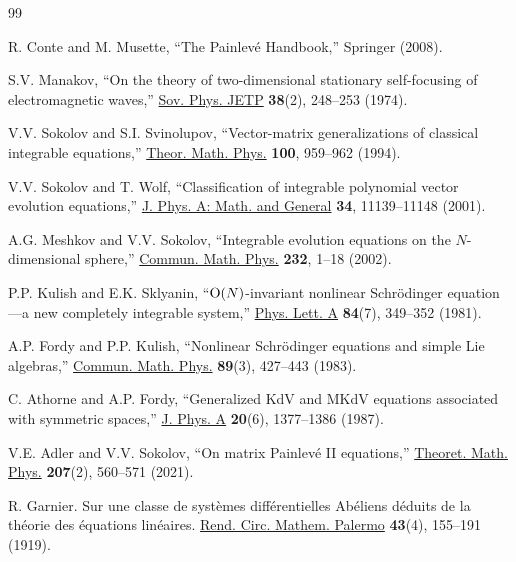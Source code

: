 \documentclass[11pt]{article}
\theoremstyle{plain}
\theoremstyle{definition}
\begin{document}
\begin{thebibliography}{99}

 R. Conte and M. Musette, ``The Painlev\'e Handbook,'' Springer (2008).

 S.V. Manakov, ``On the theory of two-dimensional stationary self-focusing of electromagnetic waves,'' \href{http://jetp.ras.ru/cgi-bin/dn/e_038_02_0248.pdf}{Sov. Phys. JETP} {\bf 38}(2), 248--253 (1974).

 V.V. Sokolov and S.I. Svinolupov, ``Vector-matrix generalizations of classical integrable equations,'' \href{https://doi.org/10.1007/BF01016758}{Theor. Math. Phys.} {\bf 100}, 959--962 (1994).

 V.V. Sokolov and T. Wolf, ``Classification of integrable polynomial vector evolution equations,'' \href{https://doi.org/10.1088/0305-4470/34/49/327}{J. Phys. A: Math. and General} {\bf 34}, 11139--11148 (2001). 

 A.G. Meshkov and  V.V. Sokolov, ``Integrable evolution equations on the $N$-dimensional sphere,'' \href{https://doi.org/10.1007/s00220-002-0737-9}{Commun. Math. Phys.} {\bf 232}, 1--18 (2002).

 P.P. Kulish and E.K. Sklyanin, ``${\rm O}(N)$-invariant nonlinear Schr\"odinger equation---a new completely integrable system,'' \href{https://doi.org/10.1016/0375-9601(81)90205-X}{Phys. Lett. A} {\bf 84}(7), 349--352 (1981).

 A.P. Fordy and P.P. Kulish, ``Nonlinear Schr\"odinger equations and simple Lie algebras,'' \href{https://doi.org/10.1007/BF01214664}{Commun. Math. Phys.} {\bf 89}(3), 427--443 (1983).

 C. Athorne and A.P. Fordy, ``Generalized KdV and MKdV equations associated with symmetric spaces,'' \href{https://doi.org/10.1088/0305-4470/20/6/021}{J. Phys. A} {\bf 20}(6), 1377--1386 (1987).

 V.E. Adler and V.V. Sokolov, ``On matrix Painlev\'e II equations,'' \href{https://doi.org/10.1134/S0040577921050020}{Theoret. Math. Phys.} {\bf 207}(2), 560--571 (2021).

 R. Garnier. Sur une classe de syst\`emes diff\'erentielles Ab\'eliens d\'eduits de la th\'eorie des \'equations lin\'eaires. \href{https://doi.org/10.1007/BF03014668}{Rend. Circ. Mathem. Palermo} {\bf 43}(4), 155--191 (1919).


\end{thebibliography}
\end{document}
